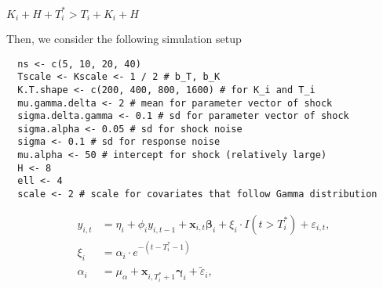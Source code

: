 \documentclass[11pt]{article}
\def\mbf#1{\mathbf{#1}} %
\def\bs#1{\boldsymbol{#1}}
\theoremstyle{definition}
\begin{document}
$K_i+H+T_i^* > T_i+K_i+H$

 Then, we consider the following simulation setup
\begin{verbatim}
  ns <- c(5, 10, 20, 40)
  Tscale <- Kscale <- 1 / 2 # b_T, b_K 
  K.T.shape <- c(200, 400, 800, 1600) # for K_i and T_i
  mu.gamma.delta <- 2 # mean for parameter vector of shock
  sigma.delta.gamma <- 0.1 # sd for parameter vector of shock
  sigma.alpha <- 0.05 # sd for shock noise  
  sigma <- 0.1 # sd for response noise
  mu.alpha <- 50 # intercept for shock (relatively large)
  H <- 8 
  ell <- 4
  scale <- 2 # scale for covariates that follow Gamma distribution
\end{verbatim}

\begin{align*}
  y_{i,t} &= \eta_i + \phi_i y_{i,t-1} + \mbf{x}_{i,t} \bs{\beta}_i + \xi_i\cdot  I(t > T_i^*) + \varepsilon_{i,t},\\
  \xi_i &= \alpha_i \cdot e^{-(t-T_i^*-1)} \\
  \alpha_i &= \mu_{\alpha} + \mbf{x}_{i,T_i^*+1}\bs{\gamma}_i + \tilde{\varepsilon}_{i},
\end{align*}












	
\end{document}

